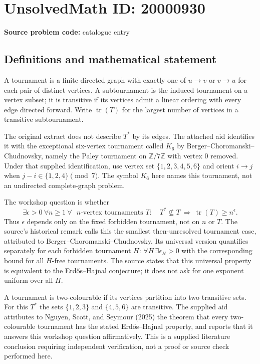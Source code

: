 \documentclass[11pt]{article}
\newcommand{\Z}{\mathbb{Z}}
\begin{document}
\section*{UnsolvedMath ID: 20000930}
\textbf{Source problem code:} catalogue entry
\subsection{Definitions and mathematical statement}
A tournament is a finite directed graph with exactly one of $u\to v$ or $v\to u$ for each pair of distinct vertices. A subtournament is the induced tournament on a vertex subset; it is transitive if its vertices admit a linear ordering with every edge directed forward. Write $\operatorname{tr}(T)$ for the largest number of vertices in a transitive subtournament.

The original extract does not describe $T^*$ by its edges. The attached aid identifies it with the exceptional six-vertex tournament called $K_6$ by Berger--Choromanski--Chudnovsky, namely the Paley tournament on $\Z/7\Z$ with vertex $0$ removed. Under that supplied identification, use vertex set $\{1,2,3,4,5,6\}$ and orient $i\to j$ when $j-i\in\{1,2,4\}\pmod7$. The symbol $K_6$ here names this tournament, not an undirected complete-graph problem.

The workshop question is whether
\[
 \exists\epsilon>0\ \forall n\geq1\ \forall\text{ $n$-vertex tournaments }T:
 \quad T^*\not\subseteq T\ \Longrightarrow\ \operatorname{tr}(T)\geq n^\epsilon.
\]
Thus $\epsilon$ depends only on the fixed forbidden tournament, not on $n$ or $T$. The source's historical remark calls this the smallest then-unresolved tournament case, attributed to Berger--Choromanski--Chudnovsky. Its universal version quantifies separately for each forbidden tournament $H$: $\forall H\,\exists\epsilon_H>0$ with the corresponding bound for all $H$-free tournaments. The source states that this universal property is equivalent to the Erd\H{o}s--Hajnal conjecture; it does not ask for one exponent uniform over all $H$.

A tournament is two-colourable if its vertices partition into two transitive sets. For this $T^*$ the sets $\{1,2,3\}$ and $\{4,5,6\}$ are transitive. The supplied aid attributes to Nguyen, Scott, and Seymour (2025) the theorem that every two-colourable tournament has the stated Erd\H{o}s--Hajnal property, and reports that it answers this workshop question affirmatively. This is a supplied literature conclusion requiring independent verification, not a proof or source check performed here.
\end{document}

